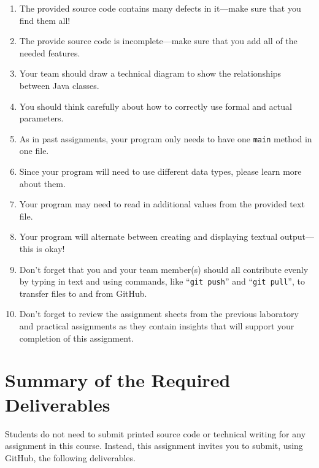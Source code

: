 \documentclass[11pt]{article}
\newcommand{\command}[1]{``\lstinline{#1}''}
\begin{document}
\begin{enumerate}
  \setlength{\itemsep}{0pt}

\item The provided source code contains many defects in it---make sure that you find them all!

\item The provide source code is incomplete---make sure that you add all of the needed features.

\item Your team should draw a technical diagram to show the relationships between Java classes.

\item You should think carefully about how to correctly use formal and actual parameters.

\item As in past assignments, your program only needs to have one {\tt main} method in one file.

\item Since your program will need to use different data types, please learn more about them.

\item Your program may need to read in additional values from the provided text file.

\item Your program will alternate between creating and displaying textual output---this is okay!

\item Don't forget that you and your team member(s) should all contribute evenly by typing in text and using commands,
  like \command{git push} and \command{git pull}, to transfer files to and from GitHub.

\item Don't forget to review the assignment sheets from the previous laboratory and practical assignments as they
  contain insights that will support your completion of this assignment.

\end{enumerate}

\section*{Summary of the Required Deliverables}

\noindent Students do not need to submit printed source code or technical writing for any assignment in this course.
Instead, this assignment invites you to submit, using GitHub, the following deliverables.
\end{document}
